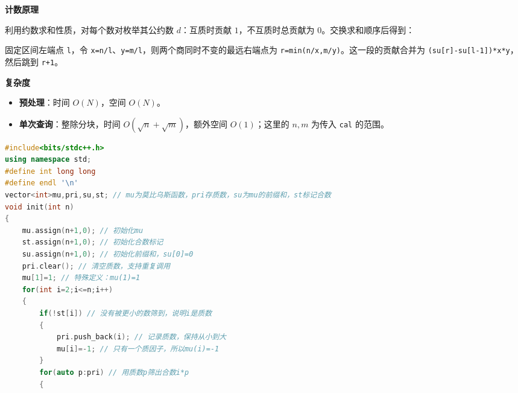 \documentclass[10pt,landscape,a4paper]{article}
\newcommand{\NotebookMath}[1]{%
  \par\begingroup
  \sbox{\NotebookMathBox}{$\displaystyle #1$}%
  \noindent\makebox[\linewidth][c]{%
    \ifdim\wd\NotebookMathBox>\linewidth
      \resizebox{\linewidth}{!}{\usebox{\NotebookMathBox}}%
    \else\usebox{\NotebookMathBox}\fi}%
  \par\endgroup}
\begin{document}
\begin{multicols*}{3}
\par\addvspace{0.7ex}\noindent\textbf{计数原理}\par\nobreak
利用约数求和性质，对每个数对枚举其公约数 $d$：互质时贡献 $1$，不互质时总贡献为 $0$。交换求和顺序后得到：\par
\NotebookMath{\operatorname{cal}(n,m)=\sum_{d=1}^{\min(n,m)}\mu(d)\left\lfloor\frac{n}{d}\right\rfloor\left\lfloor\frac{m}{d}\right\rfloor}
固定区间左端点 \texttt{l}，令 \texttt{x\allowbreak{}=\allowbreak{}n\allowbreak{}/\allowbreak{}l}、\texttt{y\allowbreak{}=\allowbreak{}m\allowbreak{}/\allowbreak{}l}，则两个商同时不变的最远右端点为 \texttt{r\allowbreak{}=\allowbreak{}m\allowbreak{}i\allowbreak{}n\allowbreak{}(\allowbreak{}n\allowbreak{}/\allowbreak{}x\allowbreak{},\allowbreak{}m\allowbreak{}/\allowbreak{}y\allowbreak{})}。这一段的贡献合并为 \texttt{(\allowbreak{}s\allowbreak{}u\allowbreak{}[\allowbreak{}r\allowbreak{}]\allowbreak{}-\allowbreak{}s\allowbreak{}u\allowbreak{}[\allowbreak{}l\allowbreak{}-\allowbreak{}1\allowbreak{}]\allowbreak{})\allowbreak{}*\allowbreak{}x\allowbreak{}*\allowbreak{}y}，然后跳到 \texttt{r\allowbreak{}+\allowbreak{}1}。\par
\par\addvspace{0.7ex}\noindent\textbf{复杂度}\par\nobreak
\begin{itemize}
\item \textbf{预处理}：时间 $O(N)$，空间 $O(N)$。
\item \textbf{单次查询}：整除分块，时间 $O(\sqrt n+\sqrt m)$，额外空间 $O(1)$；这里的 $n,m$ 为传入 \texttt{c\allowbreak{}a\allowbreak{}l} 的范围。
\end{itemize}
\par{}\par
\begin{lstlisting}[language=C++]
#include<bits/stdc++.h>
using namespace std;
#define int long long
#define endl '\n'
vector<int>mu,pri,su,st; // mu为莫比乌斯函数，pri存质数，su为mu的前缀和，st标记合数
void init(int n)
{
    mu.assign(n+1,0); // 初始化mu
    st.assign(n+1,0); // 初始化合数标记
    su.assign(n+1,0); // 初始化前缀和，su[0]=0
    pri.clear(); // 清空质数，支持重复调用
    mu[1]=1; // 特殊定义：mu(1)=1
    for(int i=2;i<=n;i++)
    {
        if(!st[i]) // 没有被更小的数筛到，说明i是质数
        {
            pri.push_back(i); // 记录质数，保持从小到大
            mu[i]=-1; // 只有一个质因子，所以mu(i)=-1
        }
        for(auto p:pri) // 用质数p筛出合数i*p
        {

\end{lstlisting}
\end{multicols*}
\end{document}
